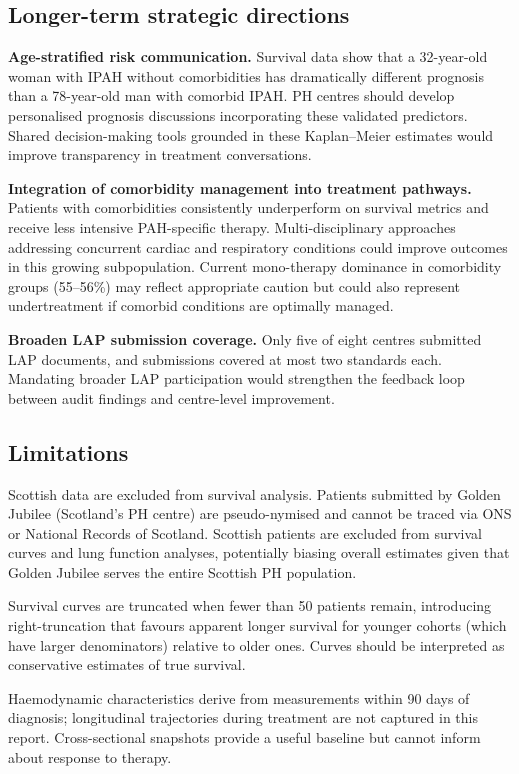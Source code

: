 \documentclass[11pt,a4paper]{article}
\begin{document}
\subsection{Longer-term strategic directions}

\textbf{Age-stratified risk communication.} Survival data show that a 32-year-old woman with IPAH without comorbidities has dramatically different prognosis than a 78-year-old man with comorbid IPAH. PH centres should develop personalised prognosis discussions incorporating these validated predictors. Shared decision-making tools grounded in these Kaplan--Meier estimates would improve transparency in treatment conversations.

\textbf{Integration of comorbidity management into treatment pathways.} Patients with comorbidities consistently underperform on survival metrics and receive less intensive PAH-specific therapy. Multi-disciplinary approaches addressing concurrent cardiac and respiratory conditions could improve outcomes in this growing subpopulation. Current mono-therapy dominance in comorbidity groups (55--56\%) may reflect appropriate caution but could also represent undertreatment if comorbid conditions are optimally managed.

\textbf{Broaden LAP submission coverage.} Only five of eight centres submitted LAP documents, and submissions covered at most two standards each. Mandating broader LAP participation would strengthen the feedback loop between audit findings and centre-level improvement.

\subsection{Limitations}

Scottish data are excluded from survival analysis. Patients submitted by Golden Jubilee (Scotland's PH centre) are pseudo-nymised and cannot be traced via ONS or National Records of Scotland. Scottish patients are excluded from survival curves and lung function analyses, potentially biasing overall estimates given that Golden Jubilee serves the entire Scottish PH population.

Survival curves are truncated when fewer than 50 patients remain, introducing right-truncation that favours apparent longer survival for younger cohorts (which have larger denominators) relative to older ones. Curves should be interpreted as conservative estimates of true survival.

Haemodynamic characteristics derive from measurements within 90 days of diagnosis; longitudinal trajectories during treatment are not captured in this report. Cross-sectional snapshots provide a useful baseline but cannot inform about response to therapy.
\end{document}
